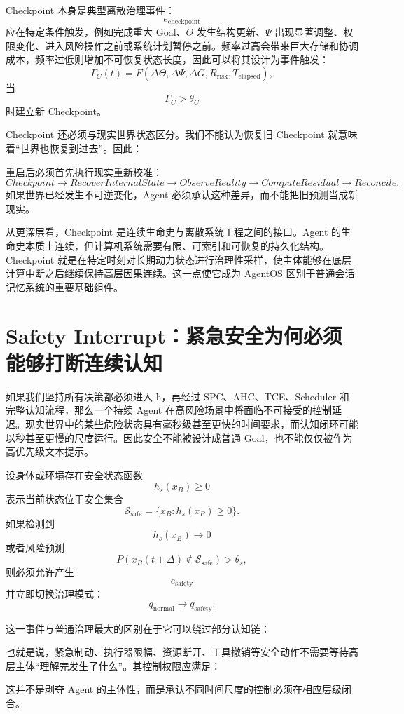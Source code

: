 Checkpoint 本身是典型离散治理事件：
\[
e_{\mathrm{checkpoint}}
\]
应在特定条件触发，例如完成重大 Goal、\(\Theta\) 发生结构更新、\(\Psi\) 出现显著调整、权限变化、进入风险操作之前或系统计划暂停之前。频率过高会带来巨大存储和协调成本，频率过低则增加不可恢复状态长度，因此可以将其设计为事件触发：
\[
\Gamma_C(t)
=
F(
\Delta\Theta,
\Delta\Psi,
\Delta G,
R_{\mathrm{risk}},
T_{\mathrm{elapsed}}
),
\]
当
\[
\Gamma_C>\theta_C
\]
时建立新 Checkpoint。

Checkpoint 还必须与现实世界状态区分。我们不能认为恢复旧 Checkpoint 就意味着“世界也恢复到过去”。因此：
\begin{statementbox}
\centering
{}
\end{statementbox}
重启后必须首先执行现实重新校准：
\[
Checkpoint
\rightarrow
RecoverInternalState
\rightarrow
ObserveReality
\rightarrow
ComputeResidual
\rightarrow
Reconcile.
\]
如果世界已经发生不可逆变化，Agent 必须承认这种差异，而不能把旧预测当成新现实。

从更深层看，Checkpoint 是连续生命史与离散系统工程之间的接口。Agent 的生命史本质上连续，但计算机系统需要有限、可索引和可恢复的持久化结构。Checkpoint 就是在特定时刻对长期动力状态进行治理性采样，使主体能够在底层计算中断之后继续保持高层因果连续。这一点使它成为 AgentOS 区别于普通会话记忆系统的重要基础组件。

\section{Safety Interrupt：紧急安全为何必须能够打断连续认知}

如果我们坚持所有决策都必须进入 h，再经过 SPC、AHC、TCE、Scheduler 和完整认知流程，那么一个持续 Agent 在高风险场景中将面临不可接受的控制延迟。现实世界中的某些危险状态具有毫秒级甚至更快的时间要求，而认知闭环可能以秒甚至更慢的尺度运行。因此安全不能被设计成普通 Goal，也不能仅仅被作为高优先级文本提示。

设身体或环境存在安全状态函数
\[
h_s(x_B)\ge 0
\]
表示当前状态位于安全集合
\[
\mathcal S_{\mathrm{safe}}
=
\{
x_B:h_s(x_B)\ge0
\}.
\]
如果检测到
\[
h_s(x_B)\rightarrow0
\]
或者风险预测
\[
P(
x_B(t+\Delta)\notin\mathcal S_{\mathrm{safe}}
)
>\theta_s,
\]
则必须允许产生
\[
e_{\mathrm{safety}}
\]
并立即切换治理模式：
\[
q_{\mathrm{normal}}
\rightarrow
q_{\mathrm{safety}}.
\]

这一事件与普通治理最大的区别在于它可以绕过部分认知链：
\begin{statementbox}
\centering
{}
\end{statementbox}
也就是说，紧急制动、执行器限幅、资源断开、工具撤销等安全动作不需要等待高层主体“理解完发生了什么”。其控制权限应满足：
\begin{statementbox}
\centering
{}
\end{statementbox}
这并不是剥夺 Agent 的主体性，而是承认不同时间尺度的控制必须在相应层级闭合。


